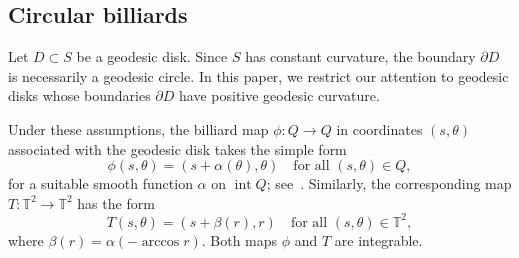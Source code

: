 \documentclass[a4paper,12pt,reqno]{amsart}
\numberwithin{equation}{section}
\newtheorem{defn}[theorem]{Definition}
\newcommand{\Tt}{{\mathbb{T}}}
\begin{document}
\subsection{Circular billiards}
\label{su:circular}

Let $D\subset S$ be a geodesic disk. Since $S$ has constant curvature, the boundary $\partial D$ is necessarily a geodesic circle. In this paper, we restrict our attention to geodesic disks whose boundaries $\partial D$ have positive geodesic curvature.

Under these assumptions, the billiard map $\phi\colon Q\to Q$ in coordinates $(s,\theta)$ associated with the geodesic disk takes the simple form
\[
\phi(s,\theta) = (s+\alpha(\theta),\theta) \quad \text{for all } (s,\theta)\in Q,
\]
for a suitable smooth function $\alpha$ on $\operatorname{int} Q$; see~\cite{Bolotin1992IntegrableBilliards,santos2022break}. Similarly, the corresponding map $T\colon\Tt^2\to\Tt^2$ has the form
\[
T(s,\theta) = (s+\beta(r),r) \quad \text{for all } (s,\theta)\in\Tt^2,
\]
where $\beta(r)=\alpha(-\arccos r)$. Both maps $\phi$ and $T$ are integrable.


\end{document}
